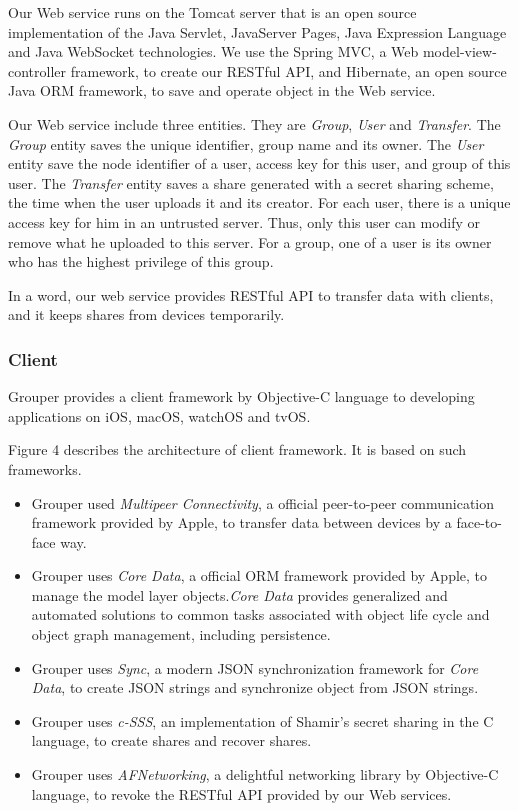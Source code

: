 \documentclass[twocolumn,10pt]{article}
\begin{document}
Our Web service runs on the Tomcat server that is an open source implementation of the Java Servlet, JavaServer Pages, Java Expression Language and Java WebSocket technologies. We use the Spring MVC, a  Web model-view-controller framework, to create our RESTful API, and Hibernate, an open source Java ORM framework, to save and operate object in the Web service. 

Our Web service include three entities. They are \emph{Group}, \emph{User} and \emph{Transfer}. The \emph{Group} entity saves the unique identifier, group name and its owner. The \emph{User} entity save the node identifier of a user, access key for this user, and group of this user. The \emph{Transfer} entity saves a share generated with a secret sharing scheme, the time when the user uploads it and its creator. For each user, there is a unique access key for him in an untrusted server. Thus, only this user can modify or remove what he uploaded to this server. For a group, one of a user is its owner who has the highest privilege of this group.

In a word, our web service provides RESTful API to transfer data with clients, and it keeps shares from devices temporarily.

\subsubsection{Client}

Grouper provides a client framework by Objective-C language to developing applications on iOS, macOS, watchOS and tvOS. 
 
Figure 4 describes the architecture of client framework. It is based on such frameworks.   

\begin{itemize}
	\setlength{\itemsep}{1pt}
	\setlength{\parskip}{0pt}
	\setlength{\parsep}{0pt}
	\item Grouper used \emph{Multipeer Connectivity}\cite{mc},  a official peer-to-peer communication framework provided by Apple, to transfer data between devices by a face-to-face way.
	\item Grouper uses \emph{Core Data}\cite{coredata}, a official ORM framework provided by Apple, to manage the model layer objects.\emph{Core Data} provides generalized and automated solutions to common tasks associated with object life cycle and object graph management, including persistence.
	\item Grouper uses \emph{Sync}\cite{sync}, a modern JSON synchronization framework for \emph{Core Data}, to create JSON strings and synchronize object from JSON strings.
	\item Grouper uses \emph{c-SSS}\cite{c-sss}, an implementation of Shamir's secret sharing in the C language, to create shares and recover shares.
	\item Grouper uses \emph{AFNetworking}\cite{afnetworking}, a delightful networking library by Objective-C language, to revoke the RESTful API provided by our Web services. 
\end{itemize}
\end{document}
